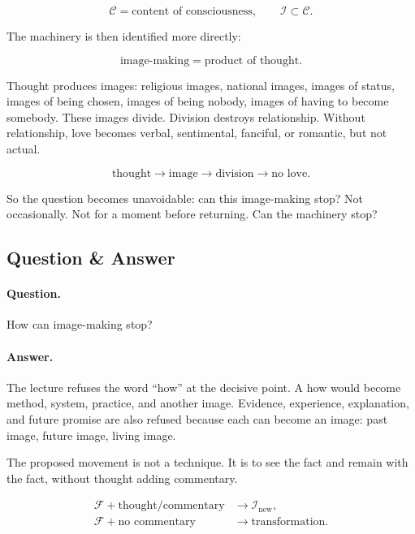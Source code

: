 \begin{equation}
\mathcal{C} = \text{content of consciousness},
\qquad
\mathcal{I} \subset \mathcal{C}.
\end{equation}

The machinery is then identified more directly:

\begin{equation}
\text{image-making} = \text{product of thought}.
\end{equation}

Thought produces images: religious images, national images, images of status, images of being chosen, images of being nobody, images of having to become somebody. These images divide. Division destroys relationship. Without relationship, love becomes verbal, sentimental, fanciful, or romantic, but not actual.

\begin{equation}
\text{thought} \to \text{image} \to \text{division} \to \text{no love}.
\end{equation}

So the question becomes unavoidable: can this image-making stop? Not occasionally. Not for a moment before returning. Can the machinery stop?

\subsection{Question \& Answer}

\paragraph{Question.}
How can image-making stop?

\paragraph{Answer.}
The lecture refuses the word ``how'' at the decisive point. A how would become method, system, practice, and another image. Evidence, experience, explanation, and future promise are also refused because each can become an image: past image, future image, living image.

The proposed movement is not a technique. It is to see the fact and remain with the fact, without thought adding commentary.

\begin{align}
\mathcal{F} + \text{thought/commentary}
&\to \mathcal{I}_{\text{new}}, \\
\mathcal{F} + \text{no commentary}
&\to \text{transformation}.
\end{align}

